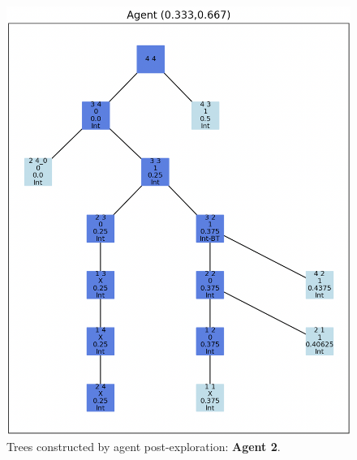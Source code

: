 \begin{figure}[H]
\centering
\includegraphics[width=1\textwidth]{Cap2/agent_2.png}
\caption{Trees constructed by agent post-exploration: \textbf{Agent 2}.}
\label{fig_agent_2_tree}
\end{figure}

